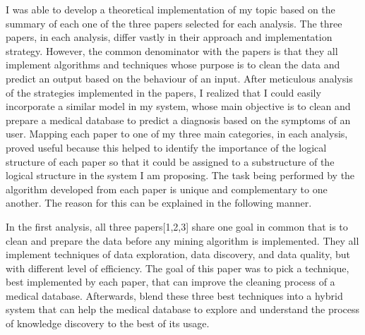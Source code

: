 \documentclass[sts]{sig-alternate}
\begin{document}
	I was able to develop a theoretical implementation of my topic based on the summary of each one of 		the three papers selected for each analysis. The three papers, in each analysis, differ vastly in 		their approach and implementation strategy. However, the common denominator with the papers is that 		they all implement algorithms and techniques whose purpose is to clean the data and predict an 			output based on the behaviour of an input. After meticulous analysis of the strategies implemented 		in the papers, I realized that I could easily incorporate a similar model in my system, whose main 		objective is to clean and prepare a medical database to predict a diagnosis based on the symptoms of 	an user. Mapping each paper to one of my three main categories, in each analysis, proved useful 			because this helped to identify the importance of the logical structure of each paper so that it 			could be assigned to a substructure of the logical structure in the system I am proposing. The task 		being performed by the algorithm developed from each paper is unique and complementary to one 			another. The reason for this can be explained in the following manner. 
	
	In the first analysis, all three papers[1,2,3] share one goal in common that is to clean and 				prepare the 	data before any mining algorithm is implemented. They all implement techniques of data 		exploration, data discovery, and data quality, but with different level of efficiency. The goal of 		this paper was to pick a technique, best implemented by each paper, that can improve the cleaning 		process of a medical database. Afterwards, blend these three best techniques into a hybrid system 		that can help the medical database to explore and understand the process of knowledge discovery to 		the best of 	its usage. 
	
\end{document}
